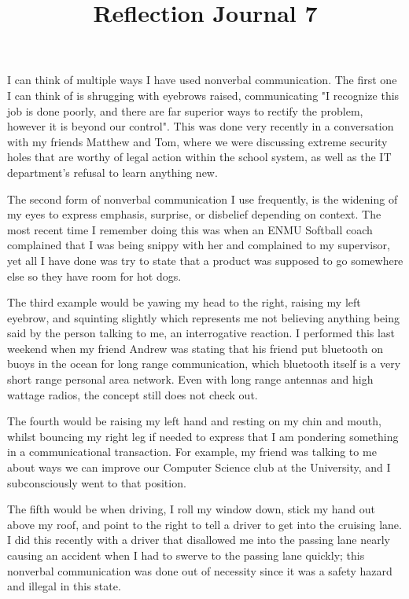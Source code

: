 \documentclass[12pt]{article}
\begin{document}
\title{Reflection Journal 7}
\par
I can think of multiple ways I have used nonverbal communication. The first one I can think of is shrugging with eyebrows raised, communicating "I recognize this job is done poorly, and there are far superior ways to rectify the problem, however it is beyond our control". This was done very recently in a conversation with my friends Matthew and Tom, where we were discussing extreme security holes that are worthy of legal action within the school system, as well as the IT department's refusal to learn anything new.
\par
The second form of nonverbal communication I use frequently, is the widening of my eyes to express emphasis, surprise, or disbelief depending on context. The most recent time I remember doing this was when an ENMU Softball coach complained that I was being snippy with her and complained to my supervisor, yet all I have done was try to state that a product was supposed to go somewhere else so they have room for hot dogs.
\par
The third example would be yawing my head to the right, raising my left eyebrow, and squinting slightly which represents me not believing anything being said by the person talking to me, an interrogative reaction. I performed this last weekend when my friend Andrew was stating that his friend put bluetooth on buoys in the ocean for long range communication, which bluetooth itself is a very short range personal area network. Even with long range antennas and high wattage radios, the concept still does not check out.
\par
The fourth would be raising my left hand and resting on my chin and mouth, whilst bouncing my right leg if needed to express that I am pondering something in a communicational transaction. For example, my friend was talking to me about ways we can improve our Computer Science club at the University, and I subconsciously went to that position.
\par
The fifth would be when driving, I roll my window down, stick my hand out above my roof, and point to the right to tell a driver to get into the cruising lane. I did this recently with a driver that disallowed me into the passing lane nearly causing an accident when I had to swerve to the passing lane quickly; this nonverbal communication was done out of necessity since it was a safety hazard and illegal in this state.
\end{document}
